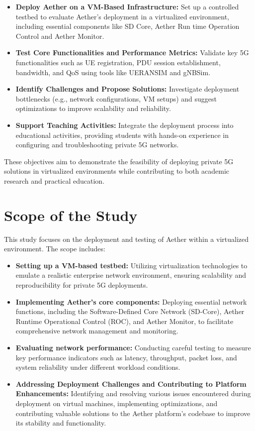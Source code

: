 \begin{itemize}
    \item \textbf{Deploy Aether on a VM-Based Infrastructure:} Set up a controlled testbed to evaluate Aether’s deployment in a virtualized environment, including essential components like SD Core, Aether Run time Operation Control and Aether Monitor.
    \item \textbf{Test Core Functionalities and Performance Metrics:} Validate key 5G functionalities such as UE registration, PDU session establishment, bandwidth, and QoS using tools like UERANSIM and gNBSim.
    \item \textbf{Identify Challenges and Propose Solutions:} Investigate deployment bottlenecks (e.g., network configurations, VM setups) and suggest optimizations to improve scalability and reliability.
    \item \textbf{Support Teaching Activities:} Integrate the deployment process into educational activities, providing students with hands-on experience in configuring and troubleshooting private 5G networks.
\end{itemize}

These objectives aim to demonstrate the feasibility of deploying private 5G solutions in virtualized environments while contributing to both academic research and practical education.

\section{Scope of the Study}

This study focuses on the deployment and testing of Aether within a virtualized environment. The scope includes:

\begin{itemize}
    \item \textbf{Setting up a VM-based testbed:} Utilizing virtualization technologies to emulate a realistic enterprise network environment, ensuring scalability and reproducibility for private 5G deployments.
    \item \textbf{Implementing Aether’s core components:} Deploying essential network functions, including the Software-Defined Core Network (SD-Core), Aether Runtime Operational Control (ROC), and Aether Monitor, to facilitate comprehensive network management and monitoring.
    \item \textbf{Evaluating network performance:} Conducting careful testing to measure key performance indicators such as latency, throughput, packet loss, and system reliability under different workload conditions.
    \item \textbf{Addressing Deployment Challenges and Contributing to Platform Enhancements:} Identifying and resolving various issues encountered during deployment on virtual machines, implementing optimizations, and contributing valuable solutions to the Aether platform’s codebase to improve its stability and functionality.
\end{itemize}

